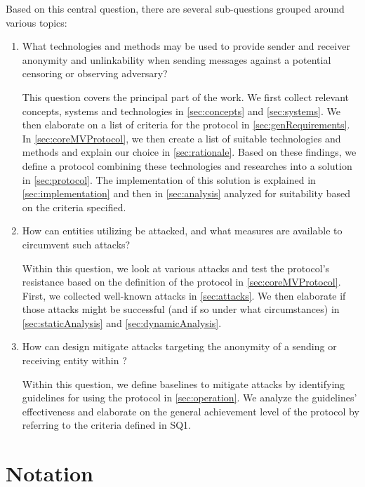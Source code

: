 Based on this central question, there are several sub-questions grouped around various topics:

\begin{enumerate}
	\item What technologies and methods may be used to provide sender and receiver anonymity and unlinkability when sending messages against a potential censoring or observing adversary? 
	
	This question covers the principal part of the work. We first collect relevant concepts, systems and technologies in \cref{sec:concepts} and \ref{sec:systems}. We then elaborate on a list of criteria for the \MessageVortex{} protocol in \cref{sec:genRequirements}. In \cref{sec:coreMVProtocol}, we then create a list of suitable technologies and methods and explain our choice in \cref{sec:rationale}. Based on these findings, we define a protocol combining these technologies and researches into a solution in \cref{sec:protocol}. The implementation of this solution is explained in \cref{sec:implementation} and then in \cref{sec:analysis} analyzed for suitability based on the criteria specified. 
	
	\item How can entities utilizing \MessageVortex{} be attacked, and what measures are available to circumvent such attacks? 
	
	Within this question, we look at various attacks and test the protocol's resistance based on the definition of the protocol in \cref{sec:coreMVProtocol}. First, we collected well-known attacks in \cref{sec:attacks}. We then elaborate if those attacks might be successful (and if so under what circumstances) in \cref{sec:staticAnalysis} and \cref{sec:dynamicAnalysis}.
	
	\item How can design mitigate attacks targeting the anonymity of a sending or receiving entity within \MessageVortex? 
	
	Within this question, we define baselines to mitigate attacks by identifying guidelines for using the protocol in \cref{sec:operation}. We analyze the guidelines' effectiveness and elaborate on the general achievement level of the protocol by referring to the criteria defined in SQ1. 
	
\end{enumerate}

\chapter{Notation}

